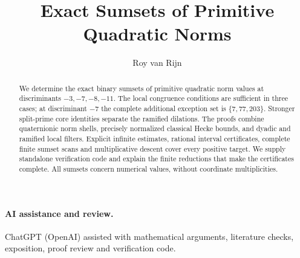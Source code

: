 \documentclass[11pt,a4paper]{article}
\title{Exact Sumsets of Primitive Quadratic Norms}
\author{Roy van Rijn}
\date{}
\theoremstyle{remark}\newtheorem{remark}[theorem]{Remark}
\begin{document}
\maketitle

\begin{abstract}
We determine the exact binary sumsets of primitive quadratic norm values
at discriminants $-3,-7,-8,-11$.  The local congruence conditions are
sufficient in three cases; at discriminant $-7$ the complete additional
exception set is $\{7,77,203\}$.  Stronger split-prime core identities
separate the ramified dilations.  The proofs combine quaternionic norm
shells, precisely normalized classical Hecke bounds, and dyadic and
ramified local filters.  Explicit infinite estimates, rational interval
certificates, complete finite sumset scans and multiplicative descent
cover every positive target.  We supply standalone verification code
and explain the finite reductions that make the certificates complete.
All sumsets concern numerical values, without coordinate multiplicities.
\end{abstract}















\paragraph{AI assistance and review.}
ChatGPT (OpenAI) assisted with mathematical arguments, literature checks,
exposition, proof review and verification code.

\appendix





\end{document}
